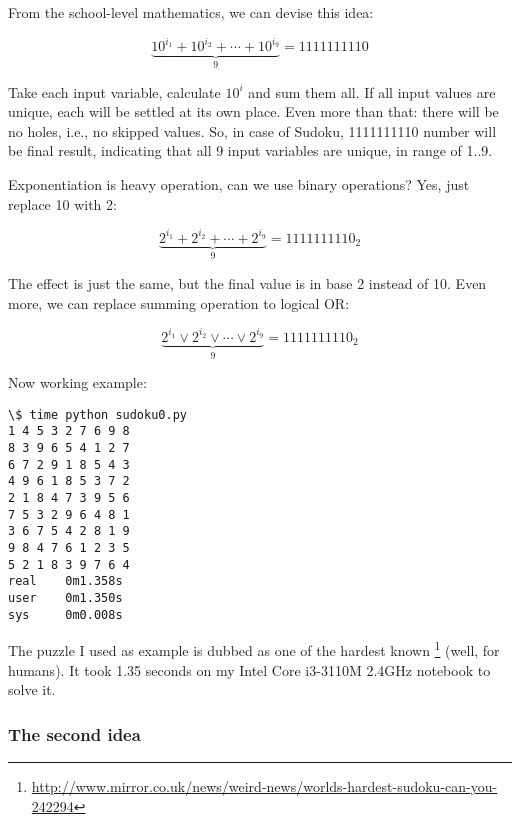 From the school-level mathematics, we can devise this idea:

\begin{equation}
\underbrace{10^{i_1} + 10^{i_2} + \cdots + 10^{i_9}}_9 = 1111111110
\end{equation}

Take each input variable, calculate $10^i$ and sum them all.
If all input values are unique, each will be settled at its own place.
Even more than that: there will be no holes, i.e., no skipped values.
So, in case of Sudoku, 1111111110 number will be final result, indicating that all 9 input variables are unique, in range of 1..9.

Exponentiation is heavy operation, can we use binary operations? Yes, just replace 10 with 2:

\begin{equation}
\underbrace{2^{i_1} + 2^{i_2} + \cdots + 2^{i_9}}_9 = 1111111110_2
\end{equation}

The effect is just the same, but the final value is in base 2 instead of 10.
Even more, we can replace summing operation to logical OR:

\begin{equation}
\underbrace{2^{i_1} \vee 2^{i_2} \vee \cdots \vee 2^{i_9}}_9 = 1111111110_2
\end{equation}

Now working example:



\begin{lstlisting}
\$ time python sudoku0.py
1 4 5 3 2 7 6 9 8
8 3 9 6 5 4 1 2 7
6 7 2 9 1 8 5 4 3
4 9 6 1 8 5 3 7 2
2 1 8 4 7 3 9 5 6
7 5 3 2 9 6 4 8 1
3 6 7 5 4 2 8 1 9
9 8 4 7 6 1 2 3 5
5 2 1 8 3 9 7 6 4
real    0m1.358s
user    0m1.350s
sys     0m0.008s
\end{lstlisting}

The puzzle I used as example is dubbed as one of the hardest known
\footnote{\url{http://www.mirror.co.uk/news/weird-news/worlds-hardest-sudoku-can-you-242294}} (well, for humans).
It took 1.35 seconds on my Intel Core i3-3110M 2.4GHz notebook to solve it.


\subsubsection{The second idea}

